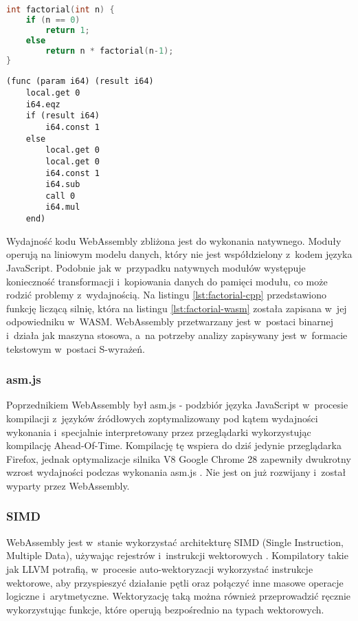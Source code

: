 \begin{lstlisting}[language=C++, caption=Funkcja licząca silnię w~języku C/C++, label=lst:factorial-cpp]
int factorial(int n) {
    if (n == 0)
        return 1;
    else
        return n * factorial(n-1);
}
\end{lstlisting}
    
\begin{lstlisting}[language=WASM, caption=Funkcja licząca silnię w~języku WASM, label=lst:factorial-wasm]
(func (param i64) (result i64)
    local.get 0
    i64.eqz
    if (result i64)
        i64.const 1
    else
        local.get 0
        local.get 0
        i64.const 1
        i64.sub
        call 0
        i64.mul
    end)
\end{lstlisting}

Wydajność kodu WebAssembly zbliżona jest do wykonania natywnego. Moduły operują na liniowym modelu danych, który nie jest współdzielony z~kodem języka JavaScript. Podobnie jak w~przypadku natywnych modułów występuje konieczność transformacji i~kopiowania danych do pamięci modułu, co może rodzić problemy z~wydajnością. Na listingu \ref{lst:factorial-cpp} przedstawiono funkcję liczącą silnię, która na listingu \ref{lst:factorial-wasm} została zapisana w~jej odpowiedniku w~WASM. WebAssembly przetwarzany jest w~postaci binarnej i~działa jak maszyna stosowa, a~na potrzeby analizy zapisywany jest w~formacie tekstowym w~postaci S-wyrażeń.

\subsubsection{asm.js}

Poprzednikiem WebAssembly był asm.js - podzbiór języka JavaScript w~procesie kompilacji z~języków źródłowych zoptymalizowany pod kątem wydajności wykonania i~specjalnie interpretowany przez przeglądarki wykorzystując kompilację Ahead-Of-Time. Kompilację tę wspiera do dziś jedynie przeglądarka Firefox, jednak optymalizacje silnika V8 Google Chrome 28 zapewniły dwukrotny wzrost wydajności podczas wykonania asm.js \cite{asm.js-chrome}. Nie jest on już rozwijany i~został wyparty przez WebAssembly.

\subsubsection{SIMD}

WebAssembly jest w~stanie wykorzystać architekturę SIMD (Single Instruction, Multiple Data), używając rejestrów i~instrukcji wektorowych \cite{wasm-simd}. Kompilatory takie jak LLVM potrafią, w~procesie auto-wektoryzacji wykorzystać instrukcje wektorowe, aby przyspieszyć działanie pętli oraz połączyć inne masowe operacje logiczne i~arytmetyczne. Wektoryzację taką można również przeprowadzić ręcznie wykorzystując funkcje, które operują bezpośrednio na typach wektorowych.

